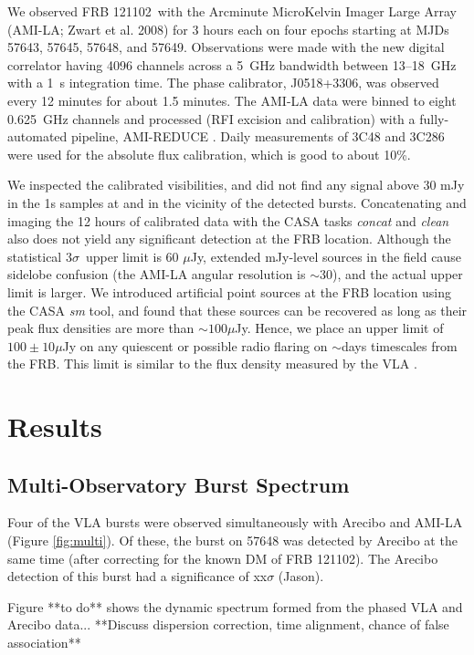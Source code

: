 \documentclass[twocolumn]{aastex61}
\newcommand{\frb}{FRB 121102}
\begin{document}
We observed \frb\ with the Arcminute MicroKelvin Imager Large Array (AMI-LA; Zwart et al. 2008) for 3 hours each on four epochs starting at MJDs 57643, 57645, 57648, and 57649. Observations were made with the new digital correlator having 4096 channels across a 5~GHz bandwidth between 13--18~GHz with a 1~s integration time. The phase calibrator, J0518+3306, was observed every 12 minutes for about 1.5 minutes. The AMI-LA data were binned to eight 0.625~GHz channels and processed (RFI excision and calibration) with a fully-automated pipeline, AMI-REDUCE \citep[e.g.,][]{2013MNRAS.429.3330P}. Daily measurements of 3C48 and 3C286 were used for the absolute flux calibration, which is good to about 10\%. 

We inspected the calibrated visibilities, and did not find any signal above 30 mJy in the 1s samples at and in the vicinity of the detected bursts. Concatenating and imaging the 12 hours of calibrated data with the CASA tasks {\it concat} and {\it clean} also does not yield any significant detection at the FRB location. Although the statistical $3\sigma$\ upper limit is 60 $\mu$Jy, extended mJy-level sources in the field cause sidelobe confusion (the AMI-LA angular resolution is $\sim$30\arcsec), and the actual upper limit is larger. We introduced artificial point sources at the FRB location using the CASA {\it sm} tool, and found that these sources can be recovered as long as their peak flux densities are more than $\sim100\mu$Jy. Hence, we place an upper limit of $100\pm10 \mu$Jy on any quiescent or possible radio flaring on $\sim$days timescales from the FRB. This limit is similar to the flux density measured by the VLA \citep{LOC}.

\section{Results}

\subsection{Multi-Observatory Burst Spectrum}
Four of the VLA bursts were observed simultaneously with Arecibo and AMI-LA (Figure \ref{fig:multi}). Of these, the burst on 57648 was detected by Arecibo at the same time (after correcting for the known DM of \frb). The Arecibo detection of this burst had a significance of {\color{red} xx$\sigma$ (Jason)}.

Figure {\color{red} **to do**} shows the dynamic spectrum formed from the phased VLA and Arecibo data... **Discuss dispersion correction, time alignment, chance of false association** 
\end{document}
